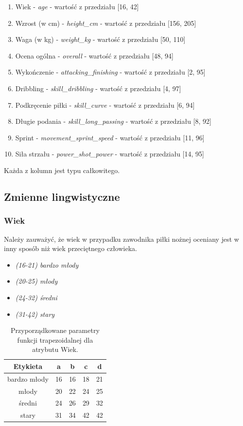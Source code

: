 \documentclass{classrep}
\begin{document}
	\begin{enumerate}
		\item Wiek - \textsl{age} - wartość z przedziału [16, 42]
		\item Wzrost (w cm) - \textsl{height\_cm} - wartość z przedziału [156, 205]
		\item Waga (w kg) - \textsl{weight\_kg} - wartość z przedziału [50, 110]
		\item Ocena ogólna - \textsl{overall} - wartość z przedziału [48, 94]
		\item Wykończenie - \textsl{attacking\_finishing} - wartość z przedziału [2, 95]
		\item Dribbling - \textsl{skill\_dribbling} - wartość z przedziału [4, 97]
		\item Podkręcenie piłki - \textsl{skill\_curve} - wartość z przedziału [6, 94]
		\item Długie podania - \textsl{skill\_long\_passing} - wartość z przedziału [8, 92]
		\item Sprint - \textsl{movement\_sprint\_speed} - wartość z przedziału [11, 96]
		\item Siła strzału - \textsl{power\_shot\_power} - wartość z przedziału [14, 95]
	\end{enumerate}

	Każda z kolumn jest typu całkowitego.

	\subsection{Zmienne lingwistyczne}
	\subsubsection{Wiek}
	Należy zauważyć, że wiek w przypadku zawodnika piłki nożnej oceniany jest w inny sposób niż wiek przeciętnego człowieka.
	\begin{itemize}
		\item \textsl{(16-21) bardzo młody}
		\item \textsl{(20-25) młody}
		\item \textsl{(24-32) średni}
		\item \textsl{(31-42) stary}
	\end{itemize}
	
	\begin{table}[h!]
		\centering
		\begin{tabular} {c c c c c}
			\hline
			\textbf{Etykieta} & \textbf{a} & \textbf{b} & \textbf{c} & \textbf{d} \\ [0.5ex] 
			\hline	
			\hline 
			bardzo młody & 16 & 16 & 18 & 21  \\
			młody & 20 & 22 & 24 & 25  \\
			średni & 24 & 26 & 29 & 32  \\
			stary & 31 & 34 & 42 & 42  \\
			\hline
		\end{tabular}
		\caption{Przyporządkowane parametry funkcji trapezoidalnej dla atrybutu  Wiek. }
		\label{tabelaWiek}
	\end{table}
\end{document}
